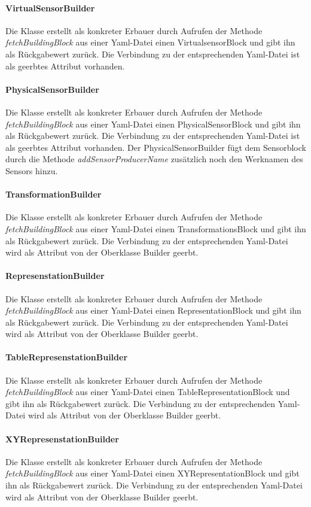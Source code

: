 \documentclass[parskip=full]{scrartcl}
\begin{document}
\paragraph{VirtualSensorBuilder}
Die Klasse erstellt als konkreter Erbauer durch Aufrufen der Methode \textit{fetchBuildingBlock} aus einer Yaml-Datei einen VirtualsensorBlock und gibt ihn als Rückgabewert zurück. Die Verbindung zu der entsprechenden Yaml-Datei ist als geerbtes Attribut vorhanden.
\paragraph{PhysicalSensorBuilder}
Die Klasse erstellt als konkreter Erbauer durch Aufrufen der Methode \textit{fetchBuildingBlock} aus einer Yaml-Datei einen PhysicalSensorBlock und gibt ihn als Rückgabewert zurück. Die Verbindung zu der entsprechenden Yaml-Datei ist als geerbtes Attribut vorhanden. Der PhysicalSensorBuilder fügt dem Sensorblock durch die Methode \textit{addSensorProducerName} zusätzlich noch den Werknamen des Sensors hinzu.
\paragraph{TransformationBuilder}
Die Klasse erstellt als konkreter Erbauer durch Aufrufen der Methode \textit{fetchBuildingBlock} aus einer Yaml-Datei einen TransformationsBlock und gibt ihn als Rückgabewert zurück. Die Verbindung zu der entsprechenden Yaml-Datei wird als Attribut von der Oberklasse Builder geerbt.

\paragraph{RepresenstationBuilder}
Die Klasse erstellt als konkreter Erbauer durch Aufrufen der Methode \textit{fetchBuildingBlock} aus einer Yaml-Datei einen RepresentationBlock und gibt ihn als Rückgabewert zurück. Die Verbindung zu der entsprechenden Yaml-Datei wird als Attribut von der Oberklasse Builder geerbt.
\paragraph{TableRepresenstationBuilder}
Die Klasse erstellt als konkreter Erbauer durch Aufrufen der Methode \textit{fetchBuildingBlock} aus einer Yaml-Datei einen TableRepresentationBlock und gibt ihn als Rückgabewert zurück. Die Verbindung zu der entsprechenden Yaml-Datei wird als Attribut von der Oberklasse Builder geerbt.
\paragraph{XYRepresenstationBuilder}
Die Klasse erstellt als konkreter Erbauer durch Aufrufen der Methode \textit{fetchBuildingBlock} aus einer Yaml-Datei einen XYRepresentationBlock und gibt ihn als Rückgabewert zurück. Die Verbindung zu der entsprechenden Yaml-Datei wird als Attribut von der Oberklasse Builder geerbt.
\end{document}
